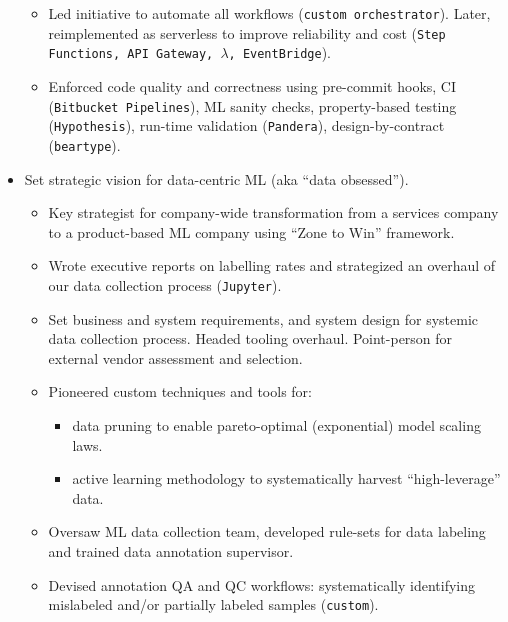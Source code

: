 \documentclass[a4paper,12pt]{article}
\begin{document}
\begin{itemize}
\begin{itemize}
            \item Led initiative to automate all workflows (\texttt{custom orchestrator}). Later, reimplemented as serverless to improve reliability and cost (\texttt{Step Functions, API Gateway, $\lambda$, EventBridge}).
            \item Enforced code quality and correctness using pre-commit hooks, CI (\texttt{Bitbucket Pipelines}), ML sanity checks, property-based testing (\texttt{Hypothesis}), run-time validation (\texttt{Pandera}), design-by-contract (\texttt{beartype}).
        \end{itemize}
        \item Set strategic vision for data-centric ML (aka ``data obsessed'').
        \begin{itemize}
            \item Key strategist for company-wide transformation from a services company to a product-based ML company using ``Zone to Win'' framework.
            \item Wrote executive reports on labelling rates and strategized an overhaul of our data collection process (\texttt{Jupyter}).
            \item Set business and system requirements, and system design for systemic data collection process. Headed tooling overhaul. Point-person for external vendor assessment and selection.
            \item Pioneered custom techniques and tools for:
            \begin{itemize}
                \item data pruning to enable pareto-optimal (exponential) model scaling laws.
                \item active learning methodology to systematically harvest ``high-leverage'' data.
            \end{itemize}
            \item Oversaw ML data collection team, developed rule-sets for data labeling and trained data annotation supervisor.
            \item Devised annotation QA and QC workflows: systematically identifying mislabeled and/or partially labeled samples (\texttt{custom}).
        \end{itemize}


    \end{itemize}
\end{document}
